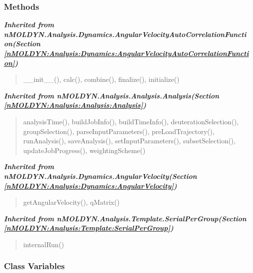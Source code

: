 
  \subsubsection{Methods}


\large{\textbf{\textit{Inherited from nMOLDYN.Analysis.Dynamics.AngularVelocityAutoCorrelationFunction\textit{(Section \ref{nMOLDYN:Analysis:Dynamics:AngularVelocityAutoCorrelationFunction})}}}}

\begin{quote}
\_\_init\_\_(), calc(), combine(), finalize(), initialize()
\end{quote}

\large{\textbf{\textit{Inherited from nMOLDYN.Analysis.Analysis.Analysis\textit{(Section \ref{nMOLDYN:Analysis:Analysis:Analysis})}}}}

\begin{quote}
analysisTime(), buildJobInfo(), buildTimeInfo(), deuterationSelection(), groupSelection(), parseInputParameters(), preLoadTrajectory(), runAnalysis(), saveAnalysis(), setInputParameters(), subsetSelection(), updateJobProgress(), weightingScheme()
\end{quote}

\large{\textbf{\textit{Inherited from nMOLDYN.Analysis.Dynamics.AngularVelocity\textit{(Section \ref{nMOLDYN:Analysis:Dynamics:AngularVelocity})}}}}

\begin{quote}
getAngularVelocity(), qMatrix()
\end{quote}

\large{\textbf{\textit{Inherited from nMOLDYN.Analysis.Template.SerialPerGroup\textit{(Section \ref{nMOLDYN:Analysis:Template:SerialPerGroup})}}}}

\begin{quote}
internalRun()
\end{quote}


  \subsubsection{Class Variables}

